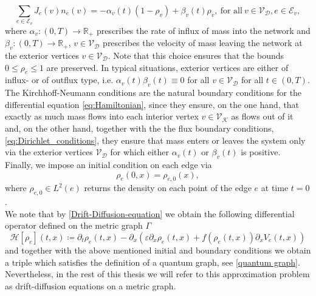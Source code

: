 \begin{equation}
    \label{eq:Dirichlet_conditions}
    \sum_{e\in \mathcal{E}_v}J_e(v) n_e (v)=-\alpha_v(t) (1-\rho_v) + \beta_v(t) \rho_v,\ \text{for all}\ v \in \mathcal{V}_\mathcal{D}, e \in \mathcal{E}_v,
\end{equation}
where $\alpha_v \colon (0,T) \to \mathbb{R}_{+}$ prescribes the rate of influx of mass into the network and $\beta_v \colon (0,T) \to \mathbb{R}_{+}$, ${v \in \mathcal{V}_\mathcal{D}}$ prescribes the velocity of mass leaving the network at the exterior vertices ${v \in \mathcal{V}_\mathcal{D}}$. Note that this choice ensures that the bounds $0 \leq \rho_e \leq 1$ are preserved. In typical situations, exterior vertices are either of influx- or of outflux type, i.e. $\alpha_v(t) \beta_v(t) \equiv 0$ for all $v \in \mathcal{V}_\mathcal{D}$ for all $t \in (0,T)$. \\
The Kirchhoff-Neumann conditions are the natural boundary conditions for the differential equation \eqref{eq:Hamiltonian}, since they ensure, on the one hand, that exactly as much mass flows into each interior vertex $v \in \mathcal{V}_{\mathcal{K}}$ as flows out of it and, on the other hand, together with the the flux boundary conditions, \cref{eq:Dirichlet_conditions}, they ensure that mass enters or leaves the system only via the exterior vertices $\mathcal{V}_\mathcal{D}$ for which either $\alpha_v(t)$ or $\beta_v(t)$ is positive. \\
Finally, we impose an initial condition on each edge via 
\begin{equation}
    \label{eq:initial_conditions}
    \rho_e(0,x) = \rho_{e, 0}(x),
\end{equation}
where $\rho_{e, 0} \in L^2(e)$ returns the density on each point of the edge $e$ at time $t=0$. \\ 



We note that by \cref{Drift-Diffusion-equation} we obtain the following differential operator defined on the metric graph $\Gamma$
\begin{equation} 
    \label{eq:Hamiltonian}
    \mathcal{H} [\rho_e] (t,x) \coloneqq \partial_t \rho_e (t,x)  - \partial_x (\varepsilon \partial_x \rho_e (t,x) + f(\rho_e (t,x) ) \partial_x V_e (t,x))
\end{equation}
and together with the above mentioned initial and boundary conditions we obtain a triple which satisfies the definition of a quantum graph, see \cref{quantum graph}. Nevertheless, in the rest of this thesis we will refer to this approximation problem as drift-diffusion equations on a metric graph. 







